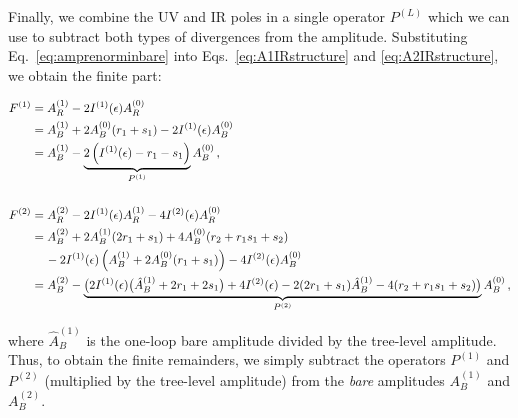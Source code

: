 \documentclass[main.tex]{subfiles}
\begin{document}
Finally, we combine the UV and IR poles in a single operator $P^{(L)}$ which we can use to subtract both types of divergences from the amplitude. Substituting Eq.~\ref{eq:amprenorminbare} into Eqs.~\ref{eq:A1IRstructure} and \ref{eq:A2IRstructure}, we obtain the finite part:
\hspace{-9.2cm}
\begin{minipage}[t]{16cm}
\begin{align}
    F^{(1)} &= A_R^{(1)} - 2 I^{(1)}(\epsilon) A_R^{(0)} \nonumber \\
            &= A_B^{(1)} + 2 A_B^{(0)}(r_1 + s_1) - 2 I^{(1)}(\epsilon) A_B^{(0)} \nonumber \\
            &= A_B^{(1)} - \underbrace{2 \left(I^{(1)}(\epsilon) - r_1 - s_1 \right)}_{P^{(1)}} A_B^{(0)} \,, \\
            &\nonumber \\
    F^{(2)} &= A_R^{(2)} - 2 I^{(1)}(\epsilon) A_R^{(1)} - 4 I^{(2)}(\epsilon) A_R^{(0)} \nonumber \\
            &= A_B^{(2)} + 2 A_B^{(1)}(2r_1 + s_1) + 4A_B^{(0)} (r_2 + r_1 s_1 + s_2) \nonumber \\
            & \quad \, -2 I^{(1)}(\epsilon) \left(A_B^{(1)} + 2 A_B^{(0)}(r_1 + s_1)\right) - 4 I^{(2)}(\epsilon) A_B^{(0)} \nonumber \\
            &= A_B^{(2)} - \underbrace{\big(2 I^{(1)}(\epsilon) \big(\hat{A}_B^{(1)} + 2 r_1 + 2 s_1\big) +4I^{(2)}(\epsilon) -2 (2r_1 + s_1) \hat{A}_B^{(1)} -  4(r_2 + r_1 s_1 + s_2) \big)}_{P^{(2)}} A_B^{(0)}\,,
\end{align}
\end{minipage}
where $\hat{A}_B^{(1)}$ is the one-loop bare amplitude divided by the tree-level amplitude. Thus, to obtain the finite remainders, we simply subtract the operators $P^{(1)}$ and $P^{(2)}$ (multiplied by the tree-level amplitude) from the \textit{bare} amplitudes $A^{(1)}_B$ and $A^{(2)}_B$.
\end{document}
